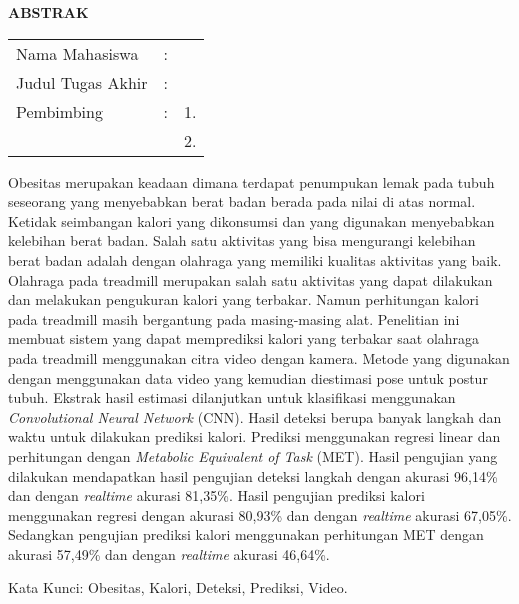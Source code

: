 \begin{center}
  \large\textbf{ABSTRAK}
\end{center}


\vspace{2ex}

\begingroup
\setlength{\tabcolsep}{0pt}

\noindent
\begin{tabularx}{\textwidth}{l >{\centering}m{2em} X}
  Nama Mahasiswa    & : & \name{}         \\

  Judul Tugas Akhir & : & \tatitle{}      \\

  Pembimbing        & : & 1. \advisor{}   \\
                    &   & 2. \coadvisor{} \\
\end{tabularx}
\endgroup

Obesitas merupakan keadaan dimana terdapat penumpukan lemak pada tubuh seseorang yang menyebabkan berat badan berada pada nilai di atas normal. Ketidak seimbangan kalori yang dikonsumsi dan yang digunakan menyebabkan kelebihan berat badan. Salah satu aktivitas yang bisa mengurangi kelebihan berat badan adalah dengan olahraga yang memiliki kualitas aktivitas yang baik. Olahraga pada treadmill merupakan salah satu aktivitas yang dapat dilakukan dan melakukan pengukuran kalori yang terbakar. Namun perhitungan kalori pada treadmill masih bergantung pada masing-masing alat. Penelitian ini membuat sistem yang dapat memprediksi kalori yang terbakar saat olahraga pada treadmill menggunakan citra video dengan kamera. Metode yang digunakan dengan menggunakan data video yang kemudian diestimasi pose untuk postur tubuh. Ekstrak hasil estimasi dilanjutkan untuk klasifikasi menggunakan \emph{Convolutional Neural Network} (CNN). Hasil deteksi berupa banyak langkah dan waktu untuk dilakukan prediksi kalori. Prediksi menggunakan regresi linear dan perhitungan dengan \emph{Metabolic Equivalent of Task} (MET). Hasil pengujian yang dilakukan mendapatkan hasil pengujian deteksi langkah dengan akurasi 96,14\% dan dengan \emph{realtime} akurasi 81,35\%. Hasil pengujian prediksi kalori menggunakan regresi dengan akurasi 80,93\% dan dengan \emph{realtime} akurasi 67,05\%. Sedangkan pengujian prediksi kalori menggunakan perhitungan MET dengan akurasi 57,49\% dan dengan \emph{realtime} akurasi 46,64\%.

Kata Kunci: Obesitas, Kalori, Deteksi, Prediksi, Video.
